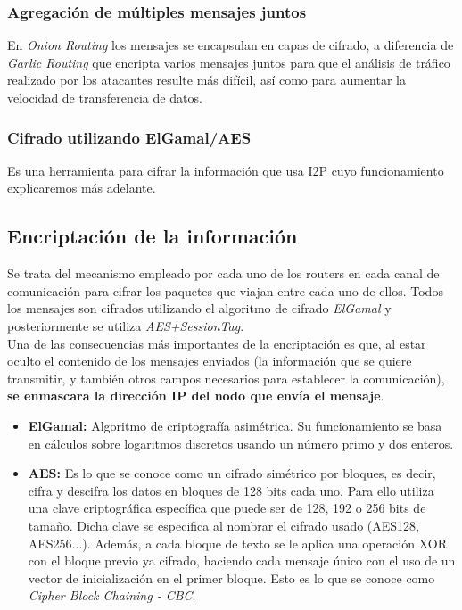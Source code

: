 \subsubsection*{Agregación de múltiples mensajes juntos}

En \textit{Onion Routing} los mensajes se encapsulan en capas de cifrado, a diferencia de \textit{Garlic Routing} que encripta varios mensajes juntos para que el análisis de tráfico realizado por los atacantes resulte más difícil, así como para aumentar la velocidad de transferencia de datos.

\subsubsection*{Cifrado utilizando ElGamal/AES}
Es una herramienta para cifrar la información que usa I2P cuyo funcionamiento explicaremos más adelante.


\subsection{Encriptación de la información}

Se trata del mecanismo empleado por cada uno de los routers en cada canal de comunicación para cifrar los paquetes que viajan entre cada uno de ellos. Todos los mensajes son cifrados utilizando el algoritmo de cifrado \textit{ElGamal} y posteriormente se utiliza \textit{AES+SessionTag}.\\

Una de las consecuencias más importantes de la encriptación es que, al estar oculto el contenido de los mensajes enviados (la información que se quiere transmitir, y también otros campos necesarios para establecer la comunicación), \textbf{se enmascara la dirección IP del nodo que envía el mensaje}.


\begin{itemize}

\item \textbf{ElGamal:}
Algoritmo de criptografía asimétrica. Su funcionamiento se basa en cálculos sobre logaritmos discretos usando un número primo y dos enteros.   


\item \textbf{AES:}
Es lo que se conoce como un cifrado simétrico por bloques, es decir, cifra y descifra los datos en bloques de 128 bits cada uno. Para ello utiliza una clave criptográfica específica que puede ser de 128, 192 o 256 bits de tamaño. Dicha clave se especifica al nombrar el cifrado usado (AES128, AES256...). Además, a cada bloque de texto se le aplica una operación XOR con el bloque previo ya cifrado, haciendo cada mensaje único con el uso de un vector de inicialización en el primer bloque. Esto es lo que se conoce como \textit{Cipher Block Chaining - CBC}.
\end{itemize}

